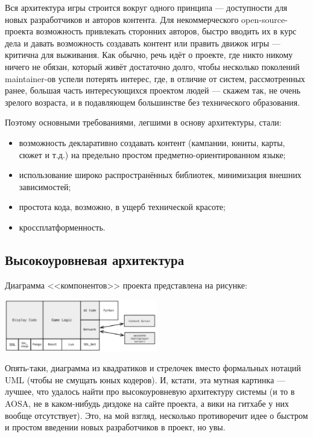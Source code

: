 \documentclass{../../text-style}
\begin{document}
Вся архитектура игры строится вокруг одного принципа --- доступности для новых разработчиков и авторов контента. Для некоммерческого open-source-проекта возможность привлекать сторонних авторов, быстро вводить их в курс дела и давать возможность создавать контент или править движок игры --- критична для выживания. Как обычно, речь идёт о проекте, где никто никому ничего не обязан, который живёт достаточно долго, чтобы несколько поколений maintainer-ов успели потерять интерес, где, в отличие от систем, рассмотренных ранее, большая часть интересующихся проектом людей --- скажем так, не очень зрелого возраста, и в подавляющем большинстве без технического образования.

Поэтому основными требованиями, легшими в основу архитектуры, стали:
\begin{itemize}
    \item возможность декларативно создавать контент (кампании, юниты, карты, сюжет и т.д.) на предельно простом предметно-ориентированном языке;
    \item использование широко распространённых библиотек, минимизация внешних зависимостей;
    \item простота кода, возможно, в ущерб технической красоте;
    \item кроссплатформенность.
\end{itemize}

\subsection{Высокоуровневая архитектура}

Диаграмма <<компонентов>> проекта представлена на рисунке:

\begin{center}
    \includegraphics[width=0.5\textwidth]{wesnothArchitecture.png}
\end{center}

Опять-таки, диаграмма из квадратиков и стрелочек вместо формальных нотаций UML (чтобы не смущать юных кодеров). И, кстати, эта мутная картинка --- лучшее, что удалось найти про высокоуровневую архитектуру системы (и то в AOSA, не в каком-нибудь диздоке на сайте проекта, а вики на гитхабе у них вообще отсутствует). Это, на мой взгляд, несколько противоречит идее о быстром и простом введении новых разработчиков в проект, но увы.
\end{document}
